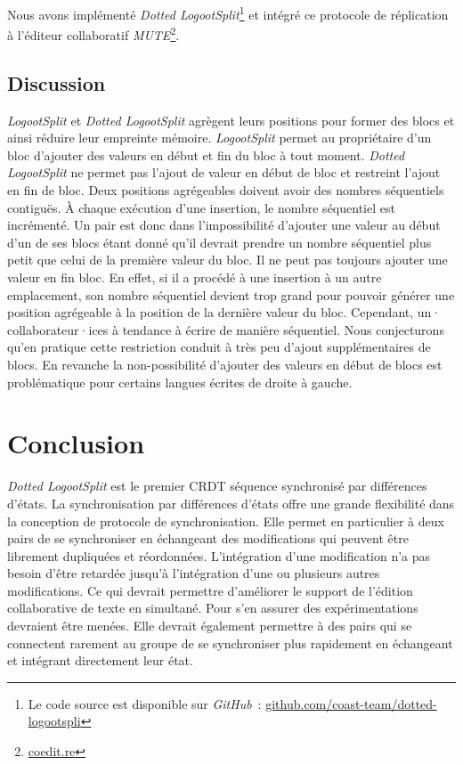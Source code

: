 Nous avons implémenté \emph{Dotted LogootSplit}\footnote{Le code source est disponible sur \emph{GitHub}~: \href{https://github.com/coast-team/dotted-logootsplit}{github.com/coast-team/dotted-logootspli}} et intégré ce protocole de réplication à l'éditeur collaboratif \emph{MUTE}\footnote{\href{https://coedit.re}{coedit.re}}.

\subsection{Discussion}

\emph{LogootSplit} et \emph{Dotted LogootSplit} agrègent leurs positions pour former des blocs et ainsi réduire leur empreinte mémoire.
\emph{LogootSplit} permet au propriétaire d'un bloc d'ajouter des valeurs en début et fin du bloc à tout moment.
\emph{Dotted LogootSplit} ne permet pas l'ajout de valeur en début de bloc et restreint l'ajout en fin de bloc.
Deux positions agrégeables doivent avoir des nombres séquentiels contiguës.
À chaque exécution d'une insertion, le nombre séquentiel est incrémenté.
Un pair est donc dans l'impossibilité d'ajouter une valeur au début d'un de ses blocs étant donné qu'il devrait prendre un nombre séquentiel plus petit que celui de la première valeur du bloc.
Il ne peut pas toujours ajouter une valeur en fin bloc.
En effet, si il a procédé à une insertion à un autre emplacement, son nombre séquentiel devient trop grand pour pouvoir générer une position agrégeable à la position de la dernière valeur du bloc.
Cependant, un· collaborateur·ices à tendance à écrire de manière séquentiel.
Nous conjecturons qu'en pratique cette restriction conduit à très peu d'ajout supplémentaires de blocs.
En revanche la non-possibilité d'ajouter des valeurs en début de blocs est problématique pour certains langues écrites de droite à gauche.


\section{Conclusion}

\emph{Dotted LogootSplit} est le premier \ac{CRDT} séquence synchronisé par différences d'états.
La synchronisation par différences d'états offre une grande flexibilité dans la conception de protocole de synchronisation.
Elle permet en particulier à deux pairs de se synchroniser en échangeant des modifications qui peuvent être librement dupliquées et réordonnées.
L'intégration d'une modification n'a pas besoin d'être retardée jusqu'à l'intégration d'une ou plusieurs autres modifications.
Ce qui devrait permettre d'améliorer le support de l'édition collaborative de texte en simultané.
Pour s'en assurer des expérimentations devraient être menées.
Elle devrait également permettre à des pairs qui se connectent rarement au groupe de se synchroniser plus rapidement en échangeant et intégrant directement leur état.
